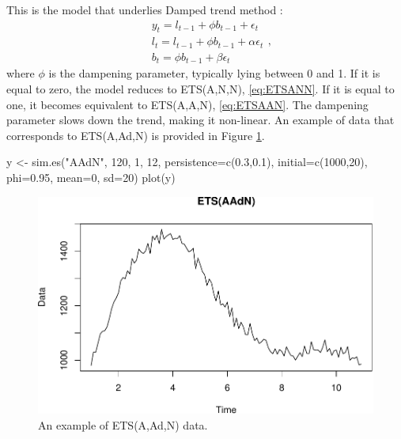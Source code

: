 \documentclass[
]{book}
\newenvironment{Shaded}{\begin{snugshade}}{\end{snugshade}}
\newcommand{\AttributeTok}[1]{\textcolor[rgb]{0.77,0.63,0.00}{#1}}
\newcommand{\DecValTok}[1]{\textcolor[rgb]{0.00,0.00,0.81}{#1}}
\newcommand{\FloatTok}[1]{\textcolor[rgb]{0.00,0.00,0.81}{#1}}
\newcommand{\FunctionTok}[1]{\textcolor[rgb]{0.00,0.00,0.00}{#1}}
\newcommand{\NormalTok}[1]{#1}
\newcommand{\OtherTok}[1]{\textcolor[rgb]{0.56,0.35,0.01}{#1}}
\newcommand{\StringTok}[1]{\textcolor[rgb]{0.31,0.60,0.02}{#1}}
\theoremstyle{definition}
\theoremstyle{definition}
\theoremstyle{definition}
\theoremstyle{definition}
\theoremstyle{remark}
\begin{document}
This is the model that underlies Damped trend method \citep{Roberts1982}:
\begin{equation}
  \begin{aligned}
    & y_{t} = l_{t-1} + \phi b_{t-1} + \epsilon_t \\
    & l_t = l_{t-1} + \phi b_{t-1} + \alpha \epsilon_t \\
    & b_t = \phi b_{t-1} + \beta \epsilon_t
  \end{aligned} ,
  \label{eq:ETSAAdN}
\end{equation}
where \(\phi\) is the dampening parameter, typically lying between 0 and 1. If it is equal to zero, the model reduces to ETS(A,N,N), \eqref{eq:ETSANN}. If it is equal to one, it becomes equivalent to ETS(A,A,N), \eqref{eq:ETSAAN}. The dampening parameter slows down the trend, making it non-linear. An example of data that corresponds to ETS(A,Ad,N) is provided in Figure \ref{fig:ETSAAdNExample}.

\begin{Shaded}
\begin{Highlighting}[]
\NormalTok{y }\OtherTok{\textless{}{-}} \FunctionTok{sim.es}\NormalTok{(}\StringTok{"AAdN"}\NormalTok{, }\DecValTok{120}\NormalTok{, }\DecValTok{1}\NormalTok{, }\DecValTok{12}\NormalTok{, }\AttributeTok{persistence=}\FunctionTok{c}\NormalTok{(}\FloatTok{0.3}\NormalTok{,}\FloatTok{0.1}\NormalTok{),}
            \AttributeTok{initial=}\FunctionTok{c}\NormalTok{(}\DecValTok{1000}\NormalTok{,}\DecValTok{20}\NormalTok{), }\AttributeTok{phi=}\FloatTok{0.95}\NormalTok{, }\AttributeTok{mean=}\DecValTok{0}\NormalTok{, }\AttributeTok{sd=}\DecValTok{20}\NormalTok{)}
\FunctionTok{plot}\NormalTok{(y)}
\end{Highlighting}
\end{Shaded}

\begin{figure}
\centering
\includegraphics{Svetunkov--2022----ADAM_files/figure-latex/ETSAAdNExample-1.pdf}
\caption{\label{fig:ETSAAdNExample}An example of ETS(A,Ad,N) data.}
\end{figure}
\end{document}
